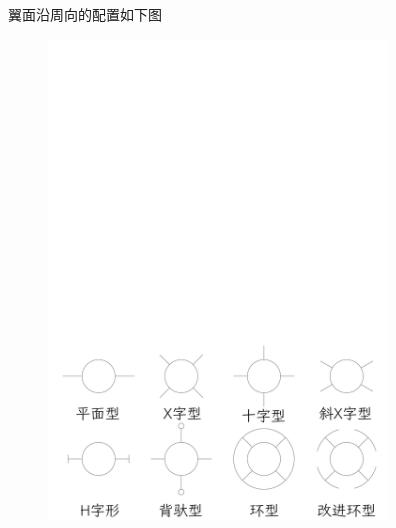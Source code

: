   翼面沿周向的配置如下图
\begin{figure}[!ht]
  \centering 
  \includegraphics[width=9cm]{./Introduction_to_rocket_missile_tec/wings.pdf}
\end{figure}

